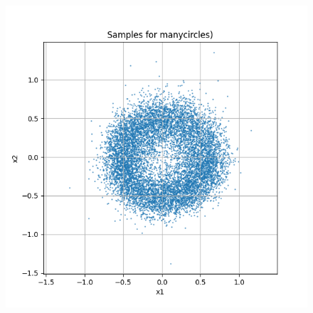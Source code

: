 \documentclass[a4paper,12pt]{article}
\begin{document}
\begin{figure}[h]
\begin{minipage}{0.3\textwidth}
  \end{minipage}
  \begin{minipage}{0.3\textwidth}
      \centering
      \includegraphics[width=\linewidth]{"images/Samples for ddpm_2_50_0.0001_0.02_manycircles.png"}
  \end{minipage}

  \vspace{0.5cm}


\end{figure}
\end{document}
